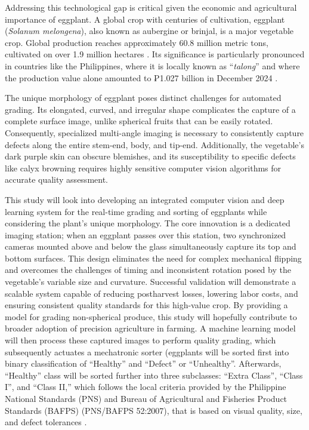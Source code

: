 {Addressing this technological gap is critical given the economic and agricultural importance of eggplant. A global crop with centuries of cultivation, eggplant (\textit{Solanum melongena}), also known as aubergine or brinjal, is a major vegetable crop. Global production reaches approximately 60.8 million metric tons, cultivated on over 1.9 million hectares \citep{fao2025eggplant}. Its significance is particularly pronounced in countries like the Philippines, where it is locally known as “\textit{talong}” and where the production value alone amounted to ₱1.027 billion in December 2024 \citep{psa2025eggplant}.

The unique morphology of eggplant poses distinct challenges for automated grading. Its elongated, curved, and irregular shape complicates the capture of a complete surface image, unlike spherical fruits that can be easily rotated. Consequently, specialized multi-angle imaging is necessary to consistently capture defects along the entire stem-end, body, and tip-end. Additionally, the vegetable’s dark purple skin can obscure blemishes, and its susceptibility to specific defects like calyx browning requires highly sensitive computer vision algorithms for accurate quality assessment.

This study will look into developing an integrated computer vision and deep learning system for the real-time grading and sorting of eggplants while considering the plant’s unique morphology. The core innovation is a dedicated imaging station; when an eggplant passes over this station, two synchronized cameras mounted above and below the glass simultaneously capture its top and bottom surfaces. This design eliminates the need for complex mechanical flipping \citep{awasthi2021development} and overcomes the challenges of timing and inconsistent rotation posed by the vegetable’s variable size and curvature. Successful validation will demonstrate a scalable system capable of reducing postharvest losses, lowering labor costs, and ensuring consistent quality standards for this high-value crop. By providing a model for grading non-spherical produce, this study will hopefully contribute to broader adoption of precision agriculture in farming. A machine learning model will then process these captured images to perform quality grading, which subsequently actuates a mechatronic sorter (eggplants will be sorted first into binary classification of “Healthy” and “Defect” or “Unhealthy”. Afterwards, “Healthy” class will be sorted further into three subclasses: “Extra Class”, “Class I”, and “Class II,” which follows the local criteria provided by the Philippine National Standards (PNS) and Bureau of Agricultural and Fisheries Product Standards (BAFPS) (PNS/BAFPS 52:2007), that is based on visual quality, size, and defect tolerances \citep{mamaril2021eggplantcomics}.

}
